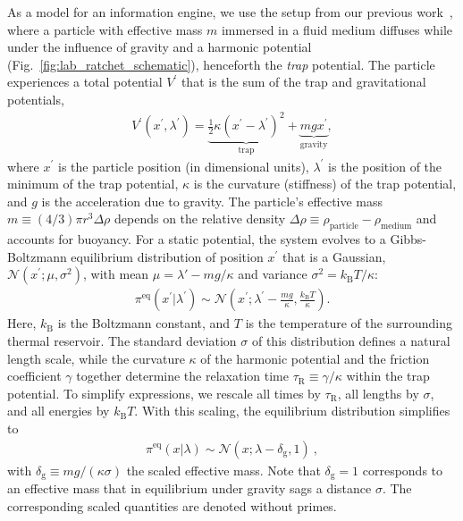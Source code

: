 \documentclass[%
reprint,
bibnotes, amsmath, amssymb, aps, pre,
 showkeys,
floatfix
]{revtex4-2}
\newcommand{\kb}{k_{\mathrm{B}}}
\newcommand{\kT}{k_{\mathrm{B}}T}
\newcommand{\mrm}{\mathrm}
\newcommand{\mcal}{\mathcal}
\newcommand{\pr}[1]{\left(#1\right)} %
\newcommand{\trelo}{\tau_{\mrm{R}}}
\newcommand{\dg}{\delta_{\mrm{g}}}
\begin{document}
As a model for an information engine, we use the setup from our previous work~\cite{Saha2021}, where a particle with effective mass $m$ immersed in a fluid medium diffuses while under the influence of gravity and a harmonic potential (Fig.~\ref{fig:lab_ratchet_schematic}), henceforth the \emph{trap} potential. 
The particle experiences a total potential $V^{\prime}$ that is the sum of the trap and gravitational potentials,
\begin{align}
    V^{\prime}(x^{\prime},\lambda^{\prime}) = \underbrace{\tfrac{1}{2}\kappa\pr{x^{\prime}-\lambda^{\prime}}^{2}}_{\text{trap}} 
            + \underbrace{mgx^{\prime}}_{\text{gravity}},\label{eq:pot_w_units}
\end{align}
where $x^{\prime}$ is the particle position (in dimensional units), $\lambda^{\prime}$ is the position of the minimum of the trap potential, $\kappa$ is the curvature (stiffness) of the trap potential, and $g$ is the acceleration due to gravity. 
The particle's effective mass $m \equiv (4/3)\pi r^{3}\Delta\rho$ depends on the relative density $\Delta\rho \equiv \rho_{\mrm{particle}} - \rho_{\mrm{medium}}$ 
and accounts for buoyancy.
For a static potential, the system evolves to a Gibbs-Boltzmann equilibrium distribution of position $x^\prime$ that is a Gaussian, $\mcal{N}(x^\prime;\mu, \sigma^{2})$, with mean $\mu = \lambda'-mg/\kappa$ and variance $\sigma^{2} = \kT/\kappa$:
\begin{align}
    \pi^{\mrm{eq}}\pr{x^{\prime}|\lambda^{\prime}} \sim \mcal{N}\pr{x^{\prime}; \lambda^{\prime}-\frac{mg}{\kappa},\frac{\kT}{\kappa}}.
\end{align}
Here, $\kb$ is the Boltzmann constant, and $T$ is the temperature of the surrounding thermal reservoir. 
The standard deviation $\sigma$ of this distribution defines a natural length scale, while the curvature $\kappa$ of the harmonic potential and the friction coefficient $\gamma$ together determine the relaxation time $\trelo\equiv\gamma/\kappa$ within the trap potential.  
To simplify expressions, we rescale all times by $\trelo$, all lengths by $\sigma$, and all energies by $\kT$. 
With this scaling, the equilibrium distribution simplifies to
\begin{align}
    \pi^{\mrm{eq}}\pr{x|\lambda} \sim \mcal{N}\pr{x; \lambda-\dg, 1}\ , \label{eq:eq_dist}
\end{align}
with $\dg \equiv mg/(\kappa\sigma)$ the scaled effective mass. 
Note that $\dg=1$ corresponds to an effective mass that in equilibrium under gravity sags a distance $\sigma$.
The corresponding scaled quantities are denoted without primes. 
\end{document}
